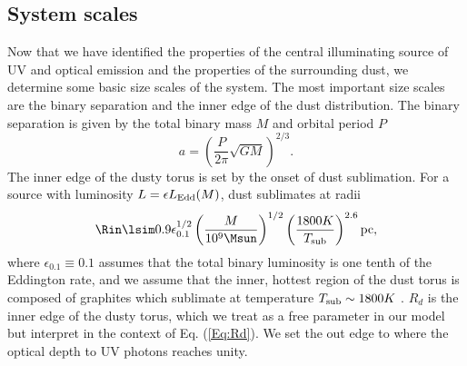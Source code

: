 \subsection{System scales} 
Now that we have identified the properties of the
central illuminating source of UV and optical emission and the properties of
the surrounding dust, we determine some basic size scales of the system. The
most important size scales are the binary separation and the inner edge of the
dust distribution. The binary separation is given by the total binary mass $M$
and orbital period $P$
\begin{equation}
a = \left(\frac{P}{2 \pi} \sqrt{GM} \right)^{2/3}.
\end{equation}
The inner edge of the dusty torus is set by the onset of dust sublimation. For a source with luminosity $L = \epsilon L_{\rm{Edd}}(M)$, dust sublimates at radii
\begin{equation}
\Rin \lsim 0.9 \epsilon^{1/2}_{0.1} \left(\frac{M}{10^9 \Msun }\right)^{1/2}  \left(\frac{1800 K}{ T_{\rm{sub}} }\right)^{2.6} \rm{pc},
\label{Eq:Rd}
\end{equation}
where $\epsilon_{0.1} \equiv 0.1$ assumes that the total binary luminosity is
one tenth of the Eddington rate, and we assume that the inner, hottest region
of the dust torus is composed of graphites which sublimate at temperature
$T_{\rm{sub}} \sim 1800 K$ \citep{MorTrakhtenbrot:2011, MorNetzer:2012}. $R_d$
is the inner edge of the dusty torus, which we treat as a free parameter in
our model but interpret in the context of Eq. (\ref{Eq:Rd}). We set the out
edge to where the optical depth to UV photons reaches unity.




